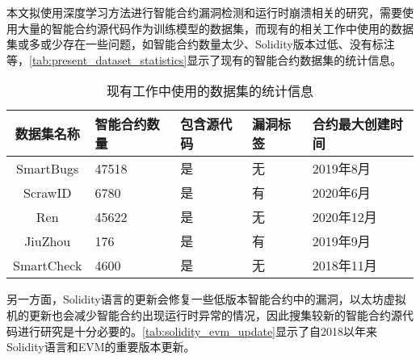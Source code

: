 本文拟使用深度学习方法进行智能合约漏洞检测和运行时崩溃相关的研究，需要使用大量的智能合约源代码作为训练模型的数据集，而现有的相关工作中使用的数据集或多或少存在一些问题，如智能合约数量太少、Solidity版本过低、没有标注等，\autoref{tab:present_dataset_statistics}显示了现有的智能合约数据集的统计信息。
\begin{table}[htbp]
    \caption{\label{tab:present_dataset_statistics}现有工作中使用的数据集的统计信息}
    \small
    \renewcommand{\arraystretch}{1.5}
    \begin{tabularx}{\linewidth}{cX<{\centering}X<{\centering}X<{\centering}p{3cm}}
        \hline
    数据集名称     & 智能合约数量 & 包含源代码 & 漏洞标签 & 合约最大创建时间            \\ \hline
    SmartBugs\cite{smartbugs} & 47518  & 是 & 无 & 2019年8月 \\
    ScrawID\cite{yashavant2022scrawld}    & 6780 & 是   & 有  & 2020年6月 \\
    Ren\cite{ren2021} &  45622 & 是 & 无 & 2020年12月 \\
    JiuZhou\cite{jiuzhou}   & 176  & 是  & 有   & 2019年9月 \\
    SmartCheck\cite{smartcheck}       & 4600   & 是 & 无 & 2018年11月  \\  \hline
    \end{tabularx}
\end{table}
另一方面，Solidity语言的更新会修复一些低版本智能合约中的漏洞，以太坊虚拟机的更新也会减少智能合约出现运行时异常的情况，因此搜集较新的智能合约源代码进行研究是十分必要的。\autoref{tab:solidity_evm_update}显示了自2018以年来Solidity语言和EVM的重要版本更新。
